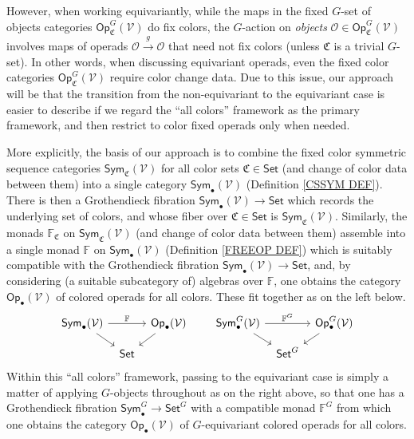 \documentclass[a4paper,10pt
]{article}%
\numberwithin{equation}{section}
\numberwithin{figure}{section}
\theoremstyle{definition} %
\newcommand{\Sym}{\ensuremath{\mathsf{Sym}}}%
\newcommand{\Op}{\mathsf{Op}}%
\newcommand{\V}{\ensuremath{\mathcal V}}
\renewcommand{\O}{\ensuremath{\mathcal O}}
\newcommand{\1}{\ensuremath{\mathbbm 1}}%
\begin{document}
However, when working equivariantly, 
while the maps in the fixed $G$-set of objects categories 
$\mathsf{Op}^G_{\mathfrak{C}}(\V)$ do fix colors, 
the $G$-action on \emph{objects}
$\O \in \mathsf{Op}^G_{\mathfrak{C}}(\V)$
involves maps of operads $\O \xrightarrow{g} \O$
that need not fix colors (unless $\mathfrak{C}$ is a trivial $G$-set).
In other words, when discussing equivariant operads,
even the fixed color categories 
$\mathsf{Op}^G_{\mathfrak{C}}(\V)$
require color change data.
Due to this issue, 
our approach will be that the transition from the non-equivariant to the equivariant case is easier to describe 
if we regard the ``all colors'' framework as the primary framework,
and then restrict to color fixed operads only when needed.

More explicitly, the basis of our approach is to combine the 
fixed color symmetric sequence categories
$\mathsf{Sym}_{\mathfrak{C}}(\V)$ for all color sets 
$\mathfrak{C} \in \mathsf{Set}$
(and change of color data between them)
into a single category $\mathsf{Sym}_{\bullet}(\V)$
(Definition \ref{CSSYM DEF}).
There is then a Grothendieck fibration
$\mathsf{Sym}_{\bullet}(\V) \to \mathsf{Set}$
which records the underlying set of colors,
and whose fiber over $\mathfrak{C} \in \mathsf{Set}$ is 
$\mathsf{Sym}_{\mathfrak{C}}(\V)$.
Similarly, the monads $\mathbb{F}_{\mathfrak{C}}$
on $\mathsf{Sym}_{\mathfrak{C}}(\mathcal{V})$
(and change of color data between them) 
assemble into a single monad $\mathbb{F}$
on $\mathsf{Sym}_{\bullet}(\V)$
(Definition \ref{FREEOP DEF})
which is suitably compatible with 
the Grothendieck fibration 
$\mathsf{Sym}_{\bullet}(\V) \to \mathsf{Set}$,
and, by considering (a suitable subcategory of) algebras over $\mathbb{F}$,
one obtains the category $\mathsf{Op}_{\bullet}(\V)$
of colored operads for all colors.
These fit together as on the left below.
\begin{equation}\label{FIBADJMON EQ}
\begin{tikzcd}[row sep = small, column sep = tiny]
\Sym_\bullet(\V) \arrow[rr, "\mathbb F"] \arrow[dr]
&&
\Op_\bullet(\V) \arrow[dl]
&&& %
\Sym^G_\bullet(\V) \arrow[rr, "\mathbb F^G"] \arrow[dr]
&&
\Op^G_\bullet(\V) \arrow[dl]
\\
&
\mathsf{Set}
&
&&& %
&
\mathsf{Set}^G
\end{tikzcd}
\end{equation}
Within this ``all colors'' framework, passing to the equivariant case is simply a matter of applying $G$-objects throughout as on the right above, 
so that one has a Grothendieck fibration
$\mathsf{Sym}_{\bullet}^G \to \mathsf{Set}^G$
with a compatible monad $\mathbb{F}^G$
from which one obtains the category 
$\mathsf{Op}_{\bullet}(\V)$
of $G$-equivariant colored operads for all colors. 
\end{document}

